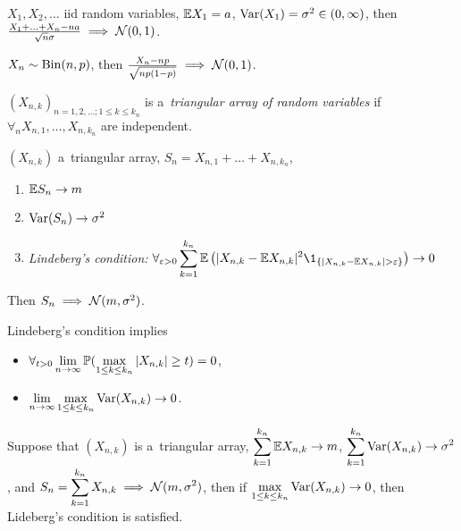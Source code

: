 



	\begin{theorem}
		$X_1, X_2, \ldots$ iid random variables, $\E X_1 = a$, $\var(X_1) = \sigma^2 \in (0,\infty)$, then $\frac{X_1 + \ldots + X_n - na}{\sqrt{n}\sigma} \implies \N(0,1)$.
	\end{theorem}
	
	\begin{corollary}
		$X_n \sim \mr{Bin}(n,p)$, then $\frac{X_n - np}{\sqrt{np(1-p)}} \implies \N(0,1)$.
	\end{corollary}
	
	\begin{definition}
		$(X_{n,k})_{n=1,2,\ldots; 1 \leq k \leq k_n}$ is a~\emph{triangular array of random variables} if $\forall_n X_{n,1}, \ldots, X_{n,k_n}$ are independent.
	\end{definition}
	
	\begin{theorem}
		$(X_{n,k})$ a~triangular array, $S_n = X_{n,1} + \ldots + X_{n,k_n}$,
		\begin{enumerate}
			\item $\E S_n \to m$
			\item $\var(S_n) \to \sigma^2$
			\item \emph{Lindeberg's condition:} $\displaystyle \forall_{\varepsilon>0} \sum_{k=1}^{k_n} \E \left( |X_{n,k} - \E X_{n,k}|^2 \1_{\{|X_{n,k} - \E X_{n,k} | > \varepsilon \}} \right) \to 0$
		\end{enumerate}
		Then $S_n \implies \N(m,\sigma^2)$.

	\end{theorem}
	
	\begin{lemma}
		Lindeberg's condition implies
		\begin{itemize}
			\item $\displaystyle \forall_{t>0} \lim_{n \to \infty} \P(\max_{1 \leq k \leq k_n} |X_{n,k}| \geq t) = 0$,
			\item $\displaystyle \lim_{n\to \infty} \max_{1 \leq k \leq k_n} \var(X_{n,k}) \to 0$.
		\end{itemize}

	\end{lemma}
	
	\begin{theorem}[Feller]
		Suppose that $(X_{n,k})$ is a~triangular array, $\displaystyle \sum_{k=1}^{k_n} \E X_{n,k} \to m$, $\displaystyle \sum_{k=1}^{k_n} \var(X_{n,k}) \to \sigma^2$, and $\displaystyle S_n= \sum_{k=1}^{k_n} X_{n,k} \implies \N(m,\sigma^2)$, then if $\displaystyle \max_{1 \leq k \leq k_n} \var(X_{n,k}) \to 0$, then Lideberg's condition is satisfied.
	\end{theorem}






 
 
